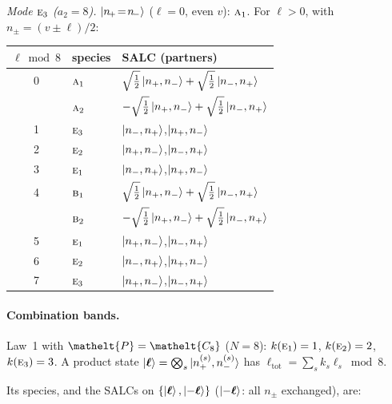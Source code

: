 \documentclass[11pt]{article}
\newcommand{\eltfont}[1]{{\let\sigma\eltsigma\mathelt{#1}}}
\newcommand{\irr}[1]{\text{\normalfont\scshape #1}}
\newcommand{\elt}[1]{\eltfont{#1}}
\newcommand{\pel}{\elt{P}}             %
\begin{document}
\emph{Mode $\irr{e}_{3}$ ($a_2=8$).} $\ket{n_{\!+}\!=\!n_{\!-}}$ ($\ell=0$, even $v$): $\irr{a}_{1}$. For $\ell>0$, with $n_\pm=(v\pm\ell)/2$:
\begin{longtable}{c l l}\hline $\ell\bmod 8$ & species & SALC (partners)\\ \hline\endhead
0 & $\irr{a}_{1}$ & $\sqrt{\tfrac{1}{2}}\ket{n_+,n_-}+\sqrt{\tfrac{1}{2}}\ket{n_-,n_+}$\\
 & $\irr{a}_{2}$ & $-\sqrt{\tfrac{1}{2}}\ket{n_+,n_-}+\sqrt{\tfrac{1}{2}}\ket{n_-,n_+}$\\
1 & $\irr{e}_{3}$ & $\ket{n_-,n_+}$,\quad $\ket{n_+,n_-}$\\
2 & $\irr{e}_{2}$ & $\ket{n_+,n_-}$,\quad $\ket{n_-,n_+}$\\
3 & $\irr{e}_{1}$ & $\ket{n_-,n_+}$,\quad $\ket{n_+,n_-}$\\
4 & $\irr{b}_{1}$ & $\sqrt{\tfrac{1}{2}}\ket{n_+,n_-}+\sqrt{\tfrac{1}{2}}\ket{n_-,n_+}$\\
 & $\irr{b}_{2}$ & $-\sqrt{\tfrac{1}{2}}\ket{n_+,n_-}+\sqrt{\tfrac{1}{2}}\ket{n_-,n_+}$\\
5 & $\irr{e}_{1}$ & $\ket{n_+,n_-}$,\quad $\ket{n_-,n_+}$\\
6 & $\irr{e}_{2}$ & $\ket{n_-,n_+}$,\quad $\ket{n_+,n_-}$\\
7 & $\irr{e}_{3}$ & $\ket{n_+,n_-}$,\quad $\ket{n_-,n_+}$\\
\hline\end{longtable}

\paragraph{Combination bands.}

Law~1 with $\pel=\elt{C_{8}}$ ($N=8$): $k(\irr{e}_{1})=1$, $k(\irr{e}_{2})=2$, $k(\irr{e}_{3})=3$. A product state $\ket{\boldsymbol\ell}=\bigotimes_s\ket{n_+^{(s)},n_-^{(s)}}$ has $\ell_{\mathrm{tot}}=\sum_sk_s\ell_s\bmod 8$.

Its species, and the SALCs on $\{\ket{\boldsymbol\ell},\ket{-\boldsymbol\ell}\}$ ($\ket{-\boldsymbol\ell}$: all $n_\pm$ exchanged), are:
\end{document}
